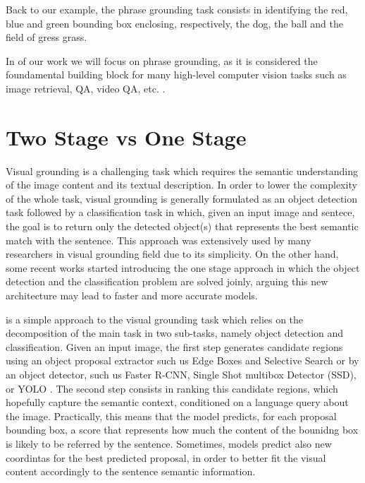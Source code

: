 Back to our example, the phrase grounding task consists in identifying
the red, blue and green bounding box enclosing, respectively, the dog,
the ball and the field of gress grass.

\newthought In of our work we will focus on phrase
grounding, as it is considered the foundamental building block for
many high-level computer vision tasks such as image retrieval, QA,
video QA, etc. .

\cite{conser2019revisiting} 

\section{Two Stage vs One Stage}

Visual grounding is a challenging task which requires the semantic
understanding of the image content and its textual description. In
order to lower the complexity of the whole task, visual grounding is
generally formulated as an object detection task followed by a
classification task in which, given an input image and sentece, the
goal is to return only the detected object(s) that represents the best
semantic match with the sentence. This approach was extensively used
by many researchers in visual grounding field  due to its simplicity. On the
other hand, some recent works started introducing the one stage
approach in which the object detection and the classification problem
are solved joinly, arguing this new architecture may lead to faster
and more accurate models.

 is a simple approach to the visual
grounding task which relies on the decomposition of the main task in
two sub-tasks, namely object detection and classification. Given an
input image, the first step generates candidate regions using an
object proposal extractor such us Edge Boxes and Selective Search
 or by an object detector, such
us Faster R-CNN, Single Shot multibox Detector (SSD), or YOLO
. The second step consists in
ranking this candidate regions, which hopefully capture the semantic
context, conditioned on a language query about the image. Practically,
this means that the model predicts, for each proposal bounding box, a
score that represents how much the content of the bounidng box is
likely to be referred by the sentence. Sometimes, models predict also
new coordintas for the best predicted proposal, in order to better fit
the visual content accordingly to the sentence semantic information.

